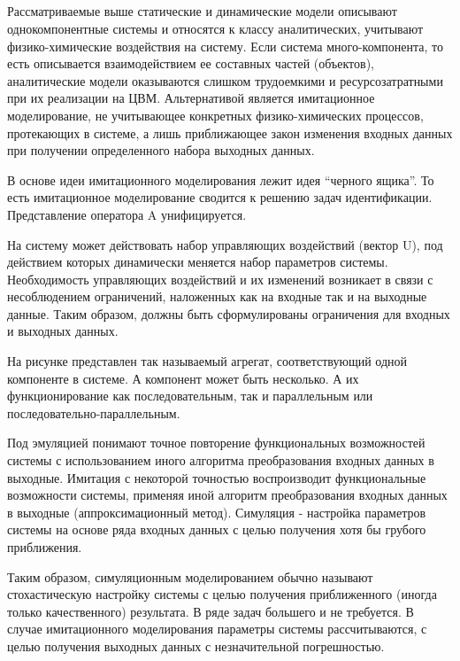 \documentclass[12pt]{article}
\begin{document}
\newpage
\subsection{}
Рассматриваемые выше статические и динамические модели описывают однокомпонентные системы и относятся к классу аналитических, учитывают физико-химические воздействия на систему. Если система много-компонента, то есть описывается взаимодействием ее составных частей (объектов), аналитические модели оказываются слишком трудоемкими и ресурсозатратными при их реализации на ЦВМ. Альтернативой является имитационное моделирование, не учитывающее конкретных физико-химических процессов, протекающих в системе, а лишь приближающее закон изменения входных данных при получении определенного набора выходных данных.

В основе идеи имитационного моделирования лежит идея \enquote{черного ящика}. То есть имитационное моделирование сводится к решению задач идентификации. Представление оператора A унифицируется.

На систему может действовать набор управляющих воздействий (вектор U), под действием которых динамически меняется набор параметров системы. Необходимость управляющих воздействий и их изменений возникает в связи с несоблюдением ограничений, наложенных как на входные так и на выходные данные. Таким образом, должны быть сформулированы ограничения для входных и выходных данных.

На рисунке представлен так называемый агрегат, соответствующий одной компоненте в системе. А компонент может быть несколько. А их функционирование как последовательным, так и параллельным или последовательно-параллельным.

Под эмуляцией понимают точное повторение функциональных возможностей системы с использованием иного алгоритма преобразования входных данных в выходные. Имитация с некоторой точностью воспроизводит функциональные возможности системы, применяя иной алгоритм преобразования входных данных в выходные (аппроксимационный метод). Симуляция  - настройка параметров системы на основе ряда входных данных с целью получения хотя бы грубого приближения.

Таким образом, симуляционным моделированием обычно называют стохастическую настройку системы с целью получения приближенного (иногда только качественного) результата. В ряде задач большего и не требуется. В случае имитационного моделирования параметры системы рассчитываются, с целью получения выходных данных с незначительной погрешностью.
\end{document}
